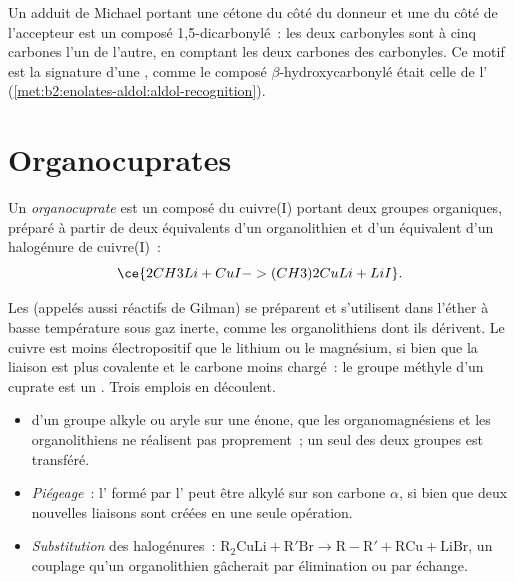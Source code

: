 Un adduit de Michael portant une cétone du côté du donneur et une du côté de l'accepteur est un composé
1,5-dicarbonylé~: les deux carbonyles sont à cinq carbones l'un de l'autre, en comptant les deux
carbones des carbonyles. Ce motif est la signature d'une , comme le composé
$\beta$-hydroxycarbonylé était celle de l' (\cref{met:b2:enolates-aldol:aldol-recognition}).

\section{Organocuprates}

\begin{definition}[Organocuprates]\label{def:b2:conjugate-additions:cuprate}
Un \emph{organocuprate}  est un composé du cuivre(I) portant deux
groupes organiques, préparé à partir de deux équivalents d'un organolithien et d'un équivalent d'un
halogénure de cuivre(I)~:
\begin{equation*}
\ce{2 CH3Li + CuI -> (CH3)2CuLi + LiI}.
\end{equation*}
\end{definition}

Les  (appelés aussi réactifs de Gilman) se préparent et s'utilisent dans l'éther à
basse température sous gaz inerte, comme les organolithiens dont ils dérivent. Le cuivre est moins
électropositif que le lithium ou le magnésium, si bien que la liaison  est plus covalente et
le carbone moins chargé~: le groupe méthyle d'un cuprate est un . Trois emplois en découlent.

\begin{itemize}
  \item \emph{} d'un groupe alkyle ou aryle sur une énone, que les organomagnésiens
        et les organolithiens ne réalisent pas proprement~; un seul des deux groupes  est transféré.
  \item \emph{Piégeage}~: l' formé par l' peut être alkylé sur son carbone
        $\alpha$, si bien que deux nouvelles liaisons  sont créées en une seule opération.
  \item \emph{Substitution} des halogénures~: $\mathrm{R_2CuLi + R'Br \to R{-}R' + RCu + LiBr}$, un
        couplage qu'un organolithien gâcherait par élimination ou par échange.
\end{itemize}


